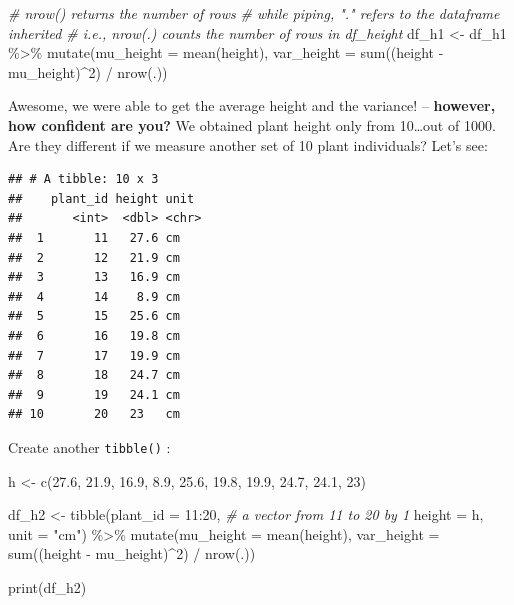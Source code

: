 \documentclass[
]{book}
\newenvironment{Shaded}{\begin{snugshade}}{\end{snugshade}}
\newcommand{\AttributeTok}[1]{\textcolor[rgb]{0.77,0.63,0.00}{#1}}
\newcommand{\CommentTok}[1]{\textcolor[rgb]{0.56,0.35,0.01}{\textit{#1}}}
\newcommand{\DecValTok}[1]{\textcolor[rgb]{0.00,0.00,0.81}{#1}}
\newcommand{\FloatTok}[1]{\textcolor[rgb]{0.00,0.00,0.81}{#1}}
\newcommand{\FunctionTok}[1]{\textcolor[rgb]{0.00,0.00,0.00}{#1}}
\newcommand{\NormalTok}[1]{#1}
\newcommand{\OtherTok}[1]{\textcolor[rgb]{0.56,0.35,0.01}{#1}}
\newcommand{\SpecialCharTok}[1]{\textcolor[rgb]{0.00,0.00,0.00}{#1}}
\newcommand{\StringTok}[1]{\textcolor[rgb]{0.31,0.60,0.02}{#1}}
\begin{document}
\begin{Shaded}
\begin{Highlighting}[]
\CommentTok{\# nrow() returns the number of rows}
\CommentTok{\# while piping, "." refers to the dataframe inherited }
\CommentTok{\# i.e., nrow(.) counts the number of rows in df\_height}
\NormalTok{df\_h1 }\OtherTok{\textless{}{-}}\NormalTok{ df\_h1 }\SpecialCharTok{\%\textgreater{}\%} 
  \FunctionTok{mutate}\NormalTok{(}\AttributeTok{mu\_height =} \FunctionTok{mean}\NormalTok{(height),}
         \AttributeTok{var\_height =} \FunctionTok{sum}\NormalTok{((height }\SpecialCharTok{{-}}\NormalTok{ mu\_height)}\SpecialCharTok{\^{}}\DecValTok{2}\NormalTok{) }\SpecialCharTok{/} \FunctionTok{nrow}\NormalTok{(.))}
\end{Highlighting}
\end{Shaded}

Awesome, we were able to get the average height and the variance! -- \textbf{however, how confident are you?} We obtained plant height only from 10\ldots out of 1000. Are they different if we measure another set of 10 plant individuals? Let's see:

\begin{verbatim}
## # A tibble: 10 x 3
##    plant_id height unit 
##       <int>  <dbl> <chr>
##  1       11   27.6 cm   
##  2       12   21.9 cm   
##  3       13   16.9 cm   
##  4       14    8.9 cm   
##  5       15   25.6 cm   
##  6       16   19.8 cm   
##  7       17   19.9 cm   
##  8       18   24.7 cm   
##  9       19   24.1 cm   
## 10       20   23   cm
\end{verbatim}

Create another \texttt{tibble()} :

\begin{Shaded}
\begin{Highlighting}[]
\NormalTok{h }\OtherTok{\textless{}{-}} \FunctionTok{c}\NormalTok{(}\FloatTok{27.6}\NormalTok{, }\FloatTok{21.9}\NormalTok{, }\FloatTok{16.9}\NormalTok{, }\FloatTok{8.9}\NormalTok{, }\FloatTok{25.6}\NormalTok{, }\FloatTok{19.8}\NormalTok{, }\FloatTok{19.9}\NormalTok{, }\FloatTok{24.7}\NormalTok{, }\FloatTok{24.1}\NormalTok{, }\DecValTok{23}\NormalTok{)}

\NormalTok{df\_h2 }\OtherTok{\textless{}{-}} \FunctionTok{tibble}\NormalTok{(}\AttributeTok{plant\_id =} \DecValTok{11}\SpecialCharTok{:}\DecValTok{20}\NormalTok{, }\CommentTok{\# a vector from 11 to 20 by 1}
                \AttributeTok{height =}\NormalTok{ h,}
                \AttributeTok{unit =} \StringTok{"cm"}\NormalTok{) }\SpecialCharTok{\%\textgreater{}\%} 
  \FunctionTok{mutate}\NormalTok{(}\AttributeTok{mu\_height =} \FunctionTok{mean}\NormalTok{(height),}
         \AttributeTok{var\_height =} \FunctionTok{sum}\NormalTok{((height }\SpecialCharTok{{-}}\NormalTok{ mu\_height)}\SpecialCharTok{\^{}}\DecValTok{2}\NormalTok{) }\SpecialCharTok{/} \FunctionTok{nrow}\NormalTok{(.))}

\FunctionTok{print}\NormalTok{(df\_h2)}
\end{Highlighting}
\end{Shaded}
\end{document}
